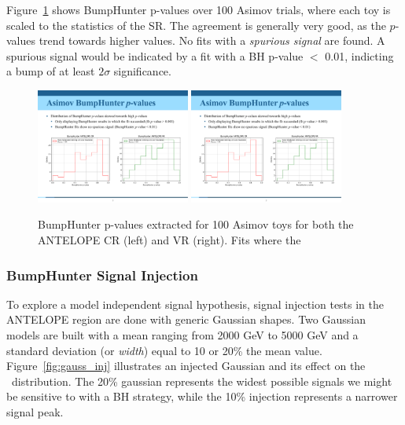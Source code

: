 Figure~\ref{fig:bh_asimov_pvals} shows BumpHunter p-values over 100 Asimov trials, where each toy is scaled to the statistics of the SR.
The agreement is generally very good, as the $p$-values trend towards higher values.
No fits with a \textit{spurious signal} are found.
A spurious signal would be indicated by a fit with a BH p-value $<$ 0.01, indicting a bump of at least $2\sigma$ significance.
\begin{figure}[!htbp]
\centering
   \includegraphics[width=0.45\textwidth]{figures/stats/bh_asimov_pvals_cr}
   \includegraphics[width=0.45\textwidth]{figures/stats/bh_asimov_pvals_vr}
    \caption{BumpHunter p-values extracted for 100 Asimov toys for both the ANTELOPE CR (left) and VR (right). Fits where the 
    \label{fig:bh_asimov_pvals}}
\end{figure}

\subsubsection{BumpHunter Signal Injection}
\label{subsec:bhsiginj}

To explore a model independent signal hypothesis, signal injection tests in the ANTELOPE region are done with generic Gaussian shapes.
Two Gaussian models are built with a mean ranging from 2000 GeV to 5000 GeV and a standard deviation (or \textit{width}) equal to 10 or 20\% the mean value.
Figure~\ref{fig:gauss_inj} illustrates an injected Gaussian and its effect on the \mt~distribution.
The 20\% gaussian represents the widest possible signals we might be sensitive to with a BH strategy, while the 10\% injection represents a narrower signal peak. 

